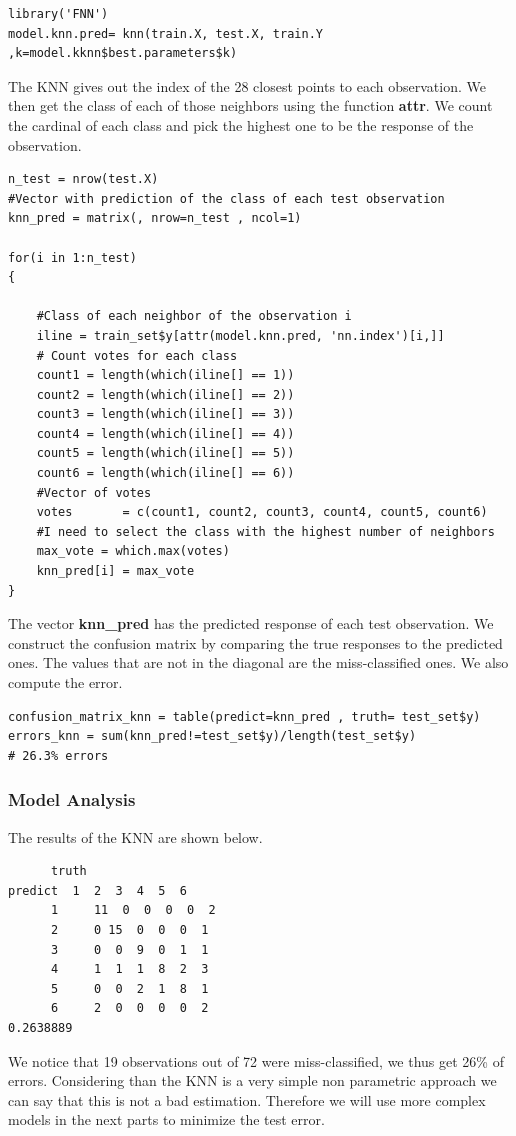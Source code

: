 \documentclass[]{report}
\begin{document}
\begin{lstlisting}
library('FNN')
model.knn.pred= knn(train.X, test.X, train.Y ,k=model.kknn$best.parameters$k)
\end{lstlisting}

The KNN gives out the index of the 28 closest points to each observation. We then get the class of each of those neighbors using the function\textbf{ attr}. We count the cardinal of each class and pick the highest one to be the response of the observation.
\pagebreak

\begin{lstlisting}
n_test = nrow(test.X)
#Vector with prediction of the class of each test observation
knn_pred = matrix(, nrow=n_test , ncol=1) 

for(i in 1:n_test)
{

    #Class of each neighbor of the observation i
    iline = train_set$y[attr(model.knn.pred, 'nn.index')[i,]]
    # Count votes for each class
    count1 = length(which(iline[] == 1)) 
    count2 = length(which(iline[] == 2)) 
    count3 = length(which(iline[] == 3)) 
    count4 = length(which(iline[] == 4)) 
    count5 = length(which(iline[] == 5)) 
    count6 = length(which(iline[] == 6)) 
    #Vector of votes
    votes       = c(count1, count2, count3, count4, count5, count6)
    #I need to select the class with the highest number of neighbors
    max_vote = which.max(votes)
    knn_pred[i] = max_vote
}
\end{lstlisting}
The vector \textbf{knn\_pred} has the predicted response of each test observation. We construct the confusion matrix by comparing the true responses to the predicted ones. The values that are not in the diagonal are the miss-classified ones. We also compute the error.
\begin{lstlisting}
confusion_matrix_knn = table(predict=knn_pred , truth= test_set$y)
errors_knn = sum(knn_pred!=test_set$y)/length(test_set$y)
# 26.3% errors
\end{lstlisting}
\pagebreak
\subsubsection{Model Analysis}
The results of the KNN are shown below.
\begin{verbatim}
      truth
predict  1  2  3  4  5  6
      1 	11  0  0  0  0  2
      2  	0 15  0  0  0  1
      3  	0  0  9  0  1  1
      4  	1  1  1  8  2  3
      5  	0  0  2  1  8  1
      6  	2  0  0  0  0  2
0.2638889
\end{verbatim}
We notice that 19 observations out of 72 were miss-classified, we thus get 26\% of errors. Considering than the KNN is a very simple non parametric approach we can say that this is not a bad estimation. Therefore we will use more complex models in the next parts to minimize the test error. 
\end{document}
